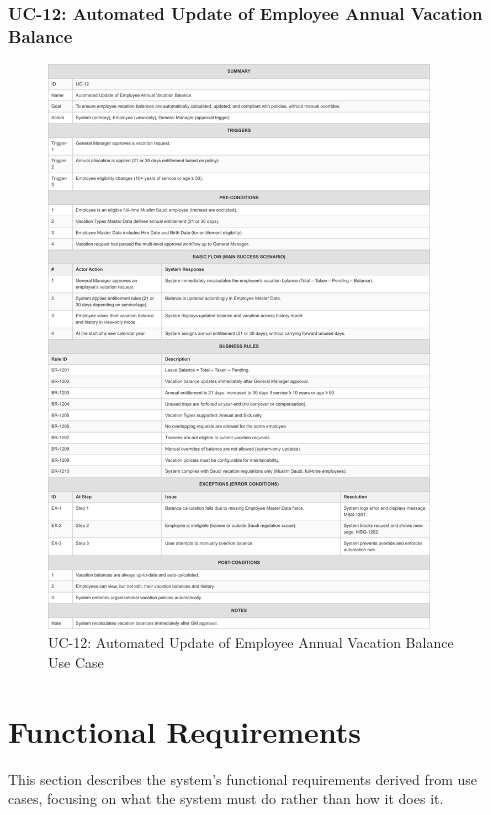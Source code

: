 \documentclass[12pt,a4paper]{article}
\begin{document}
\subsubsection{UC-12: Automated Update of Employee Annual Vacation Balance}
\begin{figure}[H]
\centering
\includegraphics[width=0.9\textwidth]{Use-Cases/UC-12-Automated-Update-of-Employee-Annual-Vacation-Balance/UC-12-Automated-Update-of-Employee-Annual-Vacation-Balance-1.png}
\caption{UC-12: Automated Update of Employee Annual Vacation Balance Use Case}
\label{fig:uc12}
\end{figure}

\section{Functional Requirements}

This section describes the system's functional requirements derived from use cases, focusing on what the system must do rather than how it does it.
\end{document}
